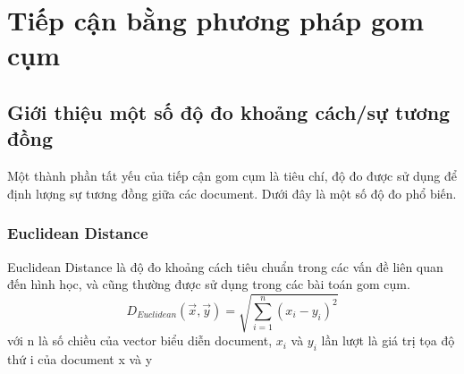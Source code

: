


\section{Tiếp cận bằng phương pháp gom cụm}
\subsection{Giới thiệu một số độ đo khoảng cách/sự tương đồng} \label{distances}
	Một thành phần tất yếu của tiếp cận gom cụm là tiêu chí, độ đo được sử dụng để định lượng sự tương đồng giữa các document. Dưới đây là một số độ đo phổ biến.
	\subsubsection*{Euclidean Distance}
	Euclidean Distance là độ đo khoảng cách tiêu chuẩn trong các vấn đề liên quan đến hình học, và cũng thường được sử dụng trong các bài toán gom cụm. 
	\begin{equation}
		D_{Euclidean}(\vec{x}, \vec{y}) = \sqrt{\sum_{i=1}^n (x_i-y_i)^2}
	\end{equation}
	với n là số chiều của vector biểu diễn document, $x_i$ và $y_i$ lần lượt là giá trị tọa độ thứ i của document x và y\\

